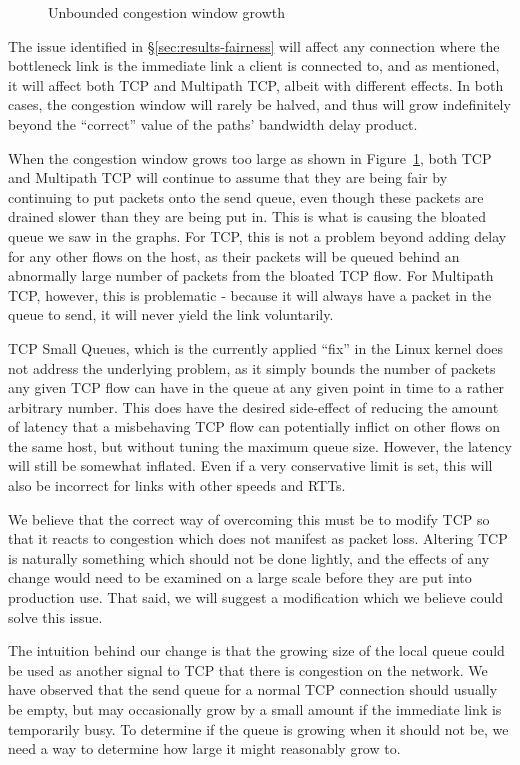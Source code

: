 \begin{figure}[h]
 \centering
 
 \caption{Unbounded congestion window growth}\label{graph:logarithmic}
\end{figure}

The issue identified in \S\ref{sec:results-fairness} will affect any
connection where the bottleneck link is the immediate link a client is connected
to, and as mentioned, it will affect both TCP and Multipath TCP, albeit with
different effects. In both cases, the congestion window will rarely be halved,
and thus will grow indefinitely beyond the ``correct'' value of the paths'
bandwidth delay product.

When the congestion window grows too large as shown in
Figure~\ref{graph:logarithmic}, both TCP and Multipath TCP will continue to
assume that they are being fair by continuing to put packets onto the send
queue, even though these packets are drained slower than they are being put in.
This is what is causing the bloated queue we saw in the graphs. For TCP, this is
not a problem beyond adding delay for any other flows on the host, as their
packets will be queued behind an abnormally large number of packets from the
bloated TCP flow. For Multipath TCP, however, this is problematic - because it
will always have a packet in the queue to send, it will never yield the link
voluntarily.

TCP Small Queues, which is the currently applied ``fix'' in the Linux kernel
does not address the underlying problem, as it simply bounds the number of
packets any given TCP flow can have in the queue at any given point in time to a
rather arbitrary number. This does have the desired side-effect of reducing the
amount of latency that a misbehaving TCP flow can potentially inflict on other
flows on the same host, but without tuning the maximum queue size. However, the
latency will still be somewhat inflated. Even if a very conservative limit is
set, this will also be incorrect for links with other speeds and RTTs.

We believe that the correct way of overcoming this must be to modify TCP so that
it reacts to congestion which does not manifest as packet loss. Altering TCP is
naturally something which should not be done lightly, and the effects of any
change would need to be examined on a large scale before they are put into
production use. That said, we will suggest a modification which we believe could
solve this issue.

The intuition behind our change is that the growing size of the local queue
could be used as another signal to TCP that there is congestion on the network.
We have observed that the send queue for a
normal TCP connection should usually be empty, but may occasionally grow by
a small amount if the immediate link is temporarily busy. To determine if the queue is
growing when it should not be, we need a way to determine how large it might
reasonably grow to.

